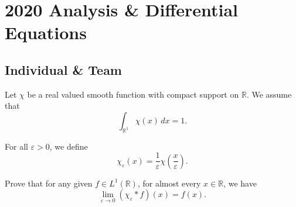 \section{2020 Analysis \& Differential Equations}

\subsection{Individual \& Team}

\begin{exercise}
\label{analysis:2020:1}
Let $\chi$ be a real valued smooth function with compact support on $\mathbb{R}$. We assume that
\[
\int_{\mathbb{R}^1}\chi(x)\,dx = 1.
\]

For all $\varepsilon>0$, we define
\[
\chi_{\varepsilon}(x) = \frac{1}{\varepsilon}\chi\left(\frac{x}{\varepsilon}\right).
\]

Prove that for any given $f\in L^1(\mathbb{R})$, for almost every $x\in\mathbb{R}$, we have
\[
\lim_{\varepsilon\to 0}(\chi_{\varepsilon}*f)(x) = f(x).
\]

\end{exercise}

